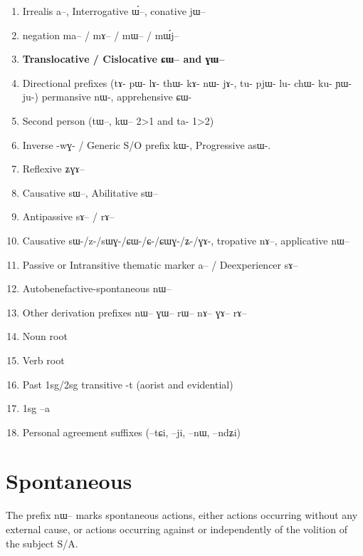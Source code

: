 \documentclass[oldfontcommands,oneside,a4paper,11pt]{article}
\newcommand{\ipa}[1]{{\phon \mbox{#1}}} %
\begin{document}
\begin{landscape}
\begin{multicols}{2}
\begin{enumerate}
\item Irrealis  \ipa{a}--, Interrogative \ipa{ɯ́}--, conative \ipa{jɯ}--
\item negation \ipa{ma}-- / \ipa{mɤ}-- / \ipa{mɯ}-- / \ipa{mɯ́j}--
\item \textbf{Translocative / Cislocative \ipa{ɕɯ}-- and \ipa{ɣɯ}--}
\item Directional prefixes (tɤ- pɯ- lɤ- thɯ- kɤ- nɯ- jɤ-, tu- pjɯ- lu- chɯ- ku- ɲɯ- ju-) permansive nɯ-, apprehensive ɕɯ-
\item Second person (\ipa{tɯ}--, \ipa{kɯ}-- 2>1 and ta- 1>2)
\item Inverse -\ipa{wɣ}- / Generic S/O prefix \ipa{kɯ}-, Progressive \ipa{asɯ}-. 
\item Reflexive \ipa{ʑɣɤ}-- 
\item Causative \ipa{sɯ}--, Abilitative \ipa{sɯ}--
\item  Antipassive  \ipa{sɤ}-- / \ipa{rɤ}--
\item Causative sɯ-/z-/sɯɣ-/ɕɯ-/ɕ-/ɕɯɣ-/ʑ-/ɣɤ-, tropative \ipa{nɤ}--, applicative \ipa{nɯ}--
\item Passive or Intransitive thematic marker \ipa{a}-- / Deexperiencer \ipa{sɤ}--
\item Autobenefactive-spontaneous \ipa{nɯ}--
\item Other derivation prefixes \ipa{nɯ}-- \ipa{ɣɯ}-- \ipa{rɯ}-- \ipa{nɤ}-- \ipa{ɣɤ}-- \ipa{rɤ}--
\item Noun root
\item Verb root 
\item Past 1sg/2sg transitive -\ipa{t} (aorist and evidential)
\item 1sg --\ipa{a}
\item Personal agreement suffixes (--\ipa{tɕi}, --\ipa{ji}, --\ipa{nɯ}, --\ipa{ndʑi})
\end{enumerate}


\end{multicols}
  \end{landscape}
 
 
 
 
 
\section{Spontaneous}
The prefix \ipa{nɯ--} marks spontaneous actions, either  actions occurring without any external cause, or actions occurring against or independently of the volition of the subject S/A.
\end{document}
